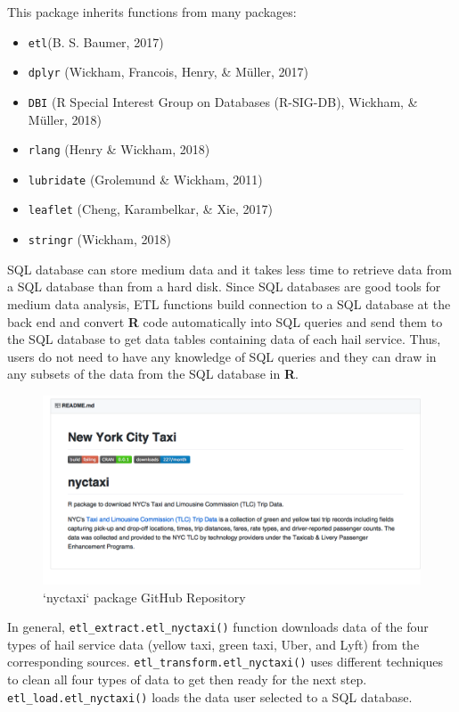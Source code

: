\documentclass[12pt,twoside]{reedthesis}
\providecommand{\tightlist}{%
  \setlength{\itemsep}{0pt}\setlength{\parskip}{0pt}}
\theoremstyle{definition}
\theoremstyle{definition}
\theoremstyle{definition}
\theoremstyle{remark}
\begin{document}
This package inherits functions from many packages:
\begin{itemize}
\tightlist
\item
  \texttt{etl}(B. S. Baumer, 2017)
\item
  \texttt{dplyr} (Wickham, Francois, Henry, \& Müller, 2017)
\item
  \texttt{DBI} (R Special Interest Group on Databases (R-SIG-DB),
  Wickham, \& Müller, 2018)
\item
  \texttt{rlang} (Henry \& Wickham, 2018)
\item
  \texttt{lubridate} (Grolemund \& Wickham, 2011)
\item
  \texttt{leaflet} (Cheng, Karambelkar, \& Xie, 2017)
\item
  \texttt{stringr} (Wickham, 2018)
\end{itemize}
SQL database can store medium data and it takes less time to retrieve
data from a SQL database than from a hard disk. Since SQL databases are
good tools for medium data analysis, ETL functions build connection to a
SQL database at the back end and convert \textbf{R} code automatically
into SQL queries and send them to the SQL database to get data tables
containing data of each hail service. Thus, users do not need to have
any knowledge of SQL queries and they can draw in any subsets of the
data from the SQL database in \textbf{R}.
\begin{figure}

{\centering \includegraphics[width=5.88in]{figure/nyctaxi-page} 

}

\caption{`nyctaxi` package GitHub Repository}\label{fig:nyctaxi-page}
\end{figure}
In general, \texttt{etl\_extract.etl\_nyctaxi()} function downloads data
of the four types of hail service data (yellow taxi, green taxi, Uber,
and Lyft) from the corresponding sources.
\texttt{etl\_transform.etl\_nyctaxi()} uses different techniques to
clean all four types of data to get then ready for the next step.
\texttt{etl\_load.etl\_nyctaxi()} loads the data user selected to a SQL
database.
\end{document}
